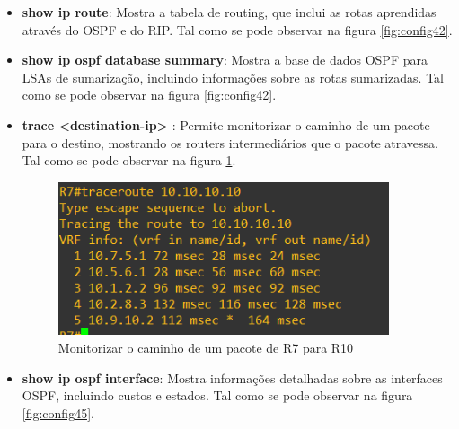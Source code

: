 \documentclass[11pt,english, openright, oneside]{book}
\begin{document}
\begin{itemize}
  \item \textbf{show ip route}: Mostra a tabela de routing, que inclui as rotas aprendidas através do OSPF e do RIP. Tal como se pode observar na figura \ref{fig:config42}.
  \vspace{0.2cm}

  \item \textbf{show ip ospf database summary}: Mostra a base de dados OSPF para LSAs de sumarização, incluindo informações sobre as rotas sumarizadas. Tal como se pode observar na figura \ref{fig:config42}.
  \vspace{0.2cm}

  \newpage
  \item \textbf{trace <destination-ip> }: Permite monitorizar o caminho de um pacote para o destino, mostrando os routers intermediários que o pacote atravessa. Tal como se pode observar na figura \ref{fig:config44}.
  \vspace{0.2cm}

  \begin{figure}[H]
    \centering
    \includegraphics[width=0.92\textwidth]{imagens/Tarefa5/25.trace_R7_R10.png}
    \caption{Monitorizar o caminho de um pacote de R7 para R10}
    \label{fig:config44}
  \end{figure}

  \newpage
  \item \textbf{show ip ospf interface}: Mostra informações detalhadas sobre as interfaces OSPF, incluindo custos e estados. Tal como se pode observar na figura \ref{fig:config45}.
  \vspace{0.2cm}


\end{itemize}
\end{document}
